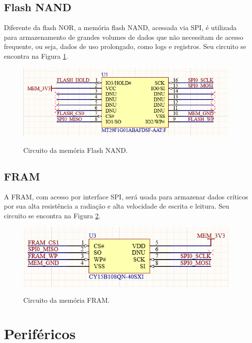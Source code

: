 \subsection{Flash NAND}

Diferente da flash NOR, a memória flash NAND, acessada via SPI, é utilizada para armazenamento de grandes volumes de dados que não necessitam de acesso frequente, ou seja, dados de uso prolongado, como logs e registros. Seu circuito se encontra na Figura \ref{fig:fnand}.

\begin{figure}[H]
    \centering
    \caption{Circuito da memória Flash NAND.}
    \includegraphics[scale=0.7]{images/flash nand.png}
    \label{fig:fnand}
\end{figure}

\subsection{FRAM}

 A FRAM, com acesso por interface SPI, será usada para armazenar dados críticos por sua alta resistência a radiação e alta velocidade de escrita e leitura. Seu circuito se encontra na Figura \ref{fig:fram}.

\begin{figure}[H]
    \centering
    \caption{Circuito da memória FRAM.}
    \includegraphics[scale=0.7]{images/fram.png}
    \label{fig:fram}
\end{figure}

\section{Periféricos}

